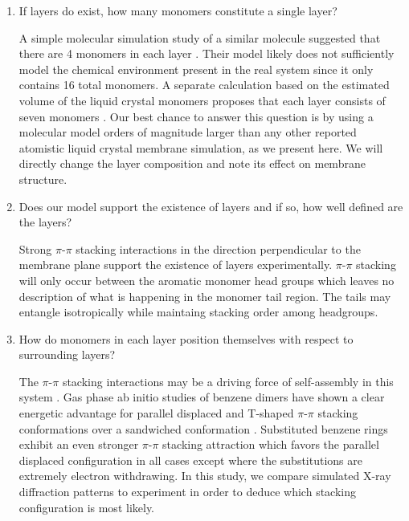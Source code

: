 \documentclass{article}
\begin{document}
  \begin{enumerate}

  \item If layers do exist, how many monomers constitute a single layer? \label{point:monomernum}
  
  A simple molecular simulation study of a similar molecule suggested that
  there are 4 monomers in each layer \cite{zhu_methacrylated_2006}. Their 
  model likely does not sufficiently model the chemical environment present
  in the real system since it only contains 16 total monomers.
  A separate calculation based on the estimated volume of the liquid crystal
  monomers proposes that each layer consists of seven monomers
  \cite{resel_structural_2000}. Our best chance to answer this question is by
  using a molecular model orders of magnitude larger than any other reported
  atomistic liquid crystal membrane simulation, as we present here. We will
  directly change the layer composition and note its effect on membrane
  structure.

  \item Does our model support the existence of layers and if so, how well
  defined are the layers? \label{point:layers} 

  Strong $\pi$-$\pi$ stacking interactions in the direction perpendicular to
  the membrane plane support the existence of layers experimentally. $\pi$-$\pi$
  stacking will only occur between the aromatic monomer head groups which leaves
  no description of what is happening in the monomer tail region. The tails may
  entangle isotropically while maintaing stacking order among headgroups. 

  \item How do monomers in each layer position themselves with respect to
  surrounding layers? \label{point:orientation}

  The $\pi$-$\pi$ stacking interactions may be a driving force of self-assembly
  in this system \cite{gazit_possible_2002}. Gas phase ab initio studies of
  benzene dimers have shown a clear energetic advantage for parallel displaced
  and T-shaped $\pi$-$\pi$ stacking conformations over a sandwiched
  conformation \cite{sinnokrot_estimates_2002}. Substituted benzene rings
  exhibit an even stronger $\pi$-$\pi$ stacking attraction which favors the
  parallel displaced configuration in all cases except where the substitutions
  are extremely electron withdrawing.
  \cite{waller_hybrid_2006,ringer_effect_2006} In this study, we compare
  simulated X-ray diffraction patterns to experiment in order to deduce which
  stacking configuration is most likely. 


\end{enumerate}
\end{document}
